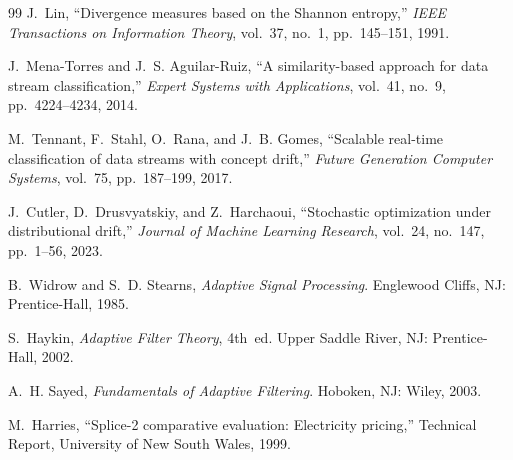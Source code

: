﻿\documentclass[12pt,a4paper]{article}
\begin{document}
\begin{thebibliography}{99}
J.~Lin, ``Divergence measures based on the Shannon entropy,'' \emph{IEEE Transactions on Information Theory}, vol.~37, no.~1, pp.~145--151, 1991.

J.~Mena-Torres and J.~S. Aguilar-Ruiz, ``A similarity-based approach for data stream classification,'' \emph{Expert Systems with Applications}, vol.~41, no.~9, pp.~4224--4234, 2014.

M.~Tennant, F.~Stahl, O.~Rana, and J.~B. Gomes, ``Scalable real-time classification of data streams with concept drift,'' \emph{Future Generation Computer Systems}, vol.~75, pp.~187--199, 2017.

J.~Cutler, D.~Drusvyatskiy, and Z.~Harchaoui, ``Stochastic optimization under distributional drift,'' \emph{Journal of Machine Learning Research}, vol.~24, no.~147, pp.~1--56, 2023.

B.~Widrow and S.~D. Stearns, \emph{Adaptive Signal Processing}. Englewood Cliffs, NJ: Prentice-Hall, 1985.

S.~Haykin, \emph{Adaptive Filter Theory}, 4th~ed. Upper Saddle River, NJ: Prentice-Hall, 2002.

A.~H. Sayed, \emph{Fundamentals of Adaptive Filtering}. Hoboken, NJ: Wiley, 2003.

M.~Harries, ``Splice-2 comparative evaluation: Electricity pricing,'' Technical Report, University of New South Wales, 1999.

\end{thebibliography}
\end{document}
